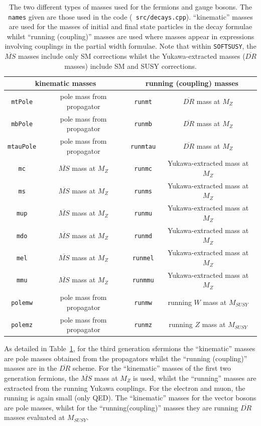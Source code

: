 \documentclass[final,3p,times]{elsarticle}
\begin{document}
\begin{center}
\begin{table}
\centering
\begin{tabular}{|c|c|c|c|} \hline
\multicolumn{2}{|c|}{kinematic masses} & \multicolumn{2}{c|}{running (coupling) masses} \\ \hline
 {\tt mtPole} & pole mass from propagator & {\tt runmt} & $\overline{DR}$ mass at $M_Z$ \\ \hline
 {\tt mbPole} & pole mass from propagator & {\tt runmb} & $\overline{DR}$ mass at $M_Z$ \\ \hline 
 {\tt mtauPole} & pole mass from propagator & {\tt runmtau} & $\overline{DR}$ mass at $M_Z$\\ \hline
 {\tt mc} & $\overline{MS}$ mass at $M_Z$ & {\tt runmc} & Yukawa-extracted mass at $M_Z$ \\ \hline
 {\tt ms} & $\overline{MS}$ mass at $M_Z$ & {\tt runms} & Yukawa-extracted mass at $M_Z$ \\ \hline
 {\tt mup} & $\overline{MS}$ mass at $M_Z$ & {\tt runmu} & Yukawa-extracted mass at $M_Z$ \\ \hline
 {\tt mdo} & $\overline{MS}$ mass at $M_Z$ & {\tt runmd} & Yukawa-extracted mass at $M_Z$ \\ \hline
 {\tt mel} & $\overline{MS}$ mass at $M_Z$ & {\tt runmel} & Yukawa-extracted mass at $M_Z$ \\ \hline
 {\tt mmu} & $\overline{MS}$ mass at $M_Z$ & {\tt runmmu} & Yukawa-extracted mass at $M_Z$ \\ \hline
 {\tt polemw} & pole mass from propagator & {\tt runmw} & running $W$ mass at $M_{SUSY}$ \\ \hline
 {\tt polemz} & pole mass from propagator & {\tt runmz} & running $Z$ mass at $M_{SUSY}$ \\ \hline
\end{tabular}
\caption{The two different types of masses used for the fermions and gauge
  bosons. The {\tt names} given are those used in the code ({\tt
    src/decays.cpp}). ``kinematic'' masses are used for the masses of initial
  and final state particles in the decay formulae whilst ``running
  (coupling)'' masses are used where masses appear in expressions involving
  couplings in the partial 
  width formulae. Note that within {\tt SOFTSUSY}, the $\overline{MS}$ masses
  include 
  only SM corrections whilst the Yukawa-extracted masses ($\overline{DR}$
  masses) include SM and SUSY corrections.} 
\label{massestable}
\end{table}
\end{center}
As detailed in Table~\ref{massestable}, for the third generation sfermions the ``kinematic'' masses are pole
masses obtained from the propagators whilst
the ``running (coupling)'' masses are in the $\overline{DR}$ scheme. For the
``kinematic'' masses of the first two generation fermions, the $\overline{MS}$
mass at $M_Z$ is used, whilst the ``running'' masses are extracted from the
running Yukawa couplings. For the electron and muon, the running is again
small (only QED). The ``kinematic'' masses for the vector bosons are pole
masses, whilst for the ``running(coupling)'' masses they are running
$\overline{DR}$ masses evaluated at $M_{SUSY}$. 
\end{document}
